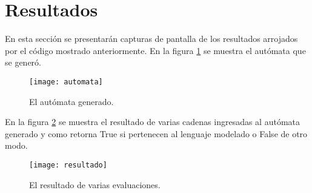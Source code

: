 \section{Resultados}

En esta sección se presentarán capturas de pantalla de los resultados arrojados por el código mostrado anteriormente. En la figura \ref{fig:automata} se muestra el autómata que se generó.

\begin{figure}[H]
	\texttt{[image: automata]}
	\caption{El autómata generado.}
	\label{fig:automata}
\end{figure}

En la figura \ref{fig:resultado} se muestra el resultado de varias cadenas ingresadas al autómata generado y como retorna True si pertenecen al lenguaje modelado o False de otro modo.

\begin{figure}[H]
	\texttt{[image: resultado]}
	\caption{El resultado de varias evaluaciones.}
	\label{fig:resultado}
\end{figure}






